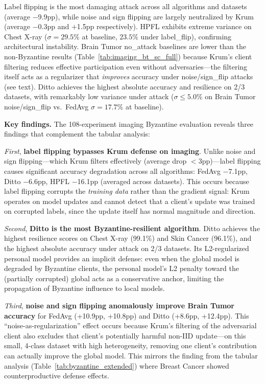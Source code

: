 \documentclass[conference]{IEEEtran}
\begin{document}
\begin{table}[htbp]
{\begin{tabular}{ll cccc cccc c}
\bottomrule
\end{tabular}%
}
\par{\footnotesize Label flipping is the most damaging attack across all algorithms and datasets (average $-$9.9pp), while noise and sign flipping are largely neutralized by Krum (average $-$0.3pp and $+$1.5pp respectively). HPFL exhibits extreme variance on Chest X-ray ($\sigma{=}29.5\%$ at baseline, $23.5\%$ under label\_flip), confirming architectural instability. Brain Tumor no\_attack baselines are lower than the non-Byzantine results (Table~\ref{tab:imaging_bt_sc_full}) because Krum's client filtering reduces effective participation even without adversaries---the filtering itself acts as a regularizer that \textit{improves} accuracy under noise/sign\_flip attacks (see text). Ditto achieves the highest absolute accuracy and resilience on 2/3 datasets, with remarkably low variance under attack ($\sigma \leq 5.0\%$ on Brain Tumor noise/sign\_flip vs.\ FedAvg $\sigma{=}17.7\%$ at baseline).}
\end{table}

\textbf{Key findings.} The 108-experiment imaging Byzantine evaluation reveals three findings that complement the tabular analysis:

\textit{First}, \textbf{label flipping bypasses Krum defense on imaging}. Unlike noise and sign flipping---which Krum filters effectively (average drop $<$3pp)---label flipping causes significant accuracy degradation across all algorithms: FedAvg $-$7.1pp, Ditto $-$6.6pp, HPFL $-$16.1pp (averaged across datasets). This occurs because label flipping corrupts the \textit{training data} rather than the gradient signal: Krum operates on model updates and cannot detect that a client's update was trained on corrupted labels, since the update itself has normal magnitude and direction.

\textit{Second}, \textbf{Ditto is the most Byzantine-resilient algorithm}. Ditto achieves the highest resilience scores on Chest X-ray (99.1\%) and Skin Cancer (96.1\%), and the highest absolute accuracy under attack on 2/3 datasets. Its L2-regularized personal model provides an implicit defense: even when the global model is degraded by Byzantine clients, the personal model's L2 penalty toward the (partially corrupted) global acts as a conservative anchor, limiting the propagation of Byzantine influence to local models.

\textit{Third}, \textbf{noise and sign flipping anomalously improve Brain Tumor accuracy} for FedAvg (+10.9pp, +10.8pp) and Ditto (+8.6pp, +12.4pp). This ``noise-as-regularization'' effect occurs because Krum's filtering of the adversarial client also excludes that client's potentially harmful non-IID update---on this small, 4-class dataset with high heterogeneity, removing one client's contribution can actually improve the global model. This mirrors the finding from the tabular analysis (Table~\ref{tab:byzantine_extended}) where Breast Cancer showed counterproductive defense effects.
\end{document}
